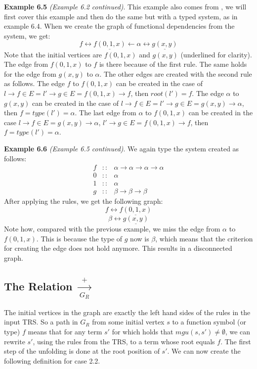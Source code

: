 \textbf{Example 6.5} \textit{(Example 6.2 continued)}. This example also comes from \cite{Payet:Unfolding}, we will first cover this example and then do the same but with a typed system, as in example 6.4. When we create the graph of functional dependencies from the system, we get:
\[
f \longleftrightarrow \underline{f(0, 1, x)} \longleftarrow \alpha \longleftrightarrow \underline{g(x,y)}
\]
Note that the initial vertices are $f(0, 1, x)$ and $g(x, y)$ (underlined for clarity). The edge from $f(0, 1, x)$ to $f$ is there because of the first rule. The same holds for the edge from $g(x, y)$ to $\alpha$. The other edges are created with the second rule as follows. The edge $f$ to $f(0, 1, x)$ can be created in the case of $l \rightarrow f \in E = l' \rightarrow g \in E = f(0, 1, x) \rightarrow f$, then $\textit{root}(l') = f$. The edge $\alpha$ to $g(x, y)$ can be created in the case of $l \rightarrow f \in E = l' \rightarrow g \in E = g(x, y) \rightarrow \alpha$, then $f = \textit{type}(l') = \alpha$. The last edge from $\alpha$ to $f(0, 1, x)$ can be created in the case $l \rightarrow f \in E = g(x, y) \rightarrow \alpha$, $l' \rightarrow g \in E = f(0, 1, x) \rightarrow f$, then $f = \textit{type}(l') = \alpha$. 

\textbf{Example 6.6} \textit{(Example 6.5 continued)}. We again type the system created as follows:
\[
\begin{array}{rcl}
    f & :: & \alpha \rightarrow \alpha \rightarrow \alpha \rightarrow \alpha \\
    0 & :: & \alpha \\
    1 & :: & \alpha \\
    g & :: & \beta \rightarrow \beta \rightarrow \beta 
\end{array}
\]
After applying the rules, we get the following graph:
\[
f \longleftrightarrow \underline{f(0, 1, x)} 
\]
\[
\beta \longleftrightarrow \underline{g(x,y)}
\]
Note how, compared with the previous example, we miss the edge from $\alpha$ to $f(0, 1, x)$. This is because the type of $g$ now is $\beta$, which means that the criterion for creating the edge does not hold anymore. This results in a disconnected graph. 

\subsection*{The Relation $\xrightarrow[G_R]{+}$}
The initial vertices in the graph are exactly the left hand sides of the rules in the input TRS. So a path in $G_R$ from some initial vertex $s$ to a function symbol (or type) $f$ means that for any term $s'$ for which holds that $\textit{mgu}(s, s') \neq \emptyset$, we can rewrite $s'$, using the rules from the TRS, to a term whose root equals $f$. The first step of the unfolding is done at the root position of $s'$. We can now create the following definition for case 2.2.

